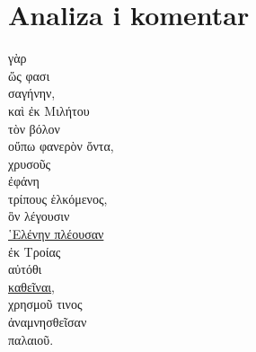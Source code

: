 \section*{Analiza i komentar}



{\large
\noindent {} γὰρ \\
\tabto{2em} ὥς φασι \\
 σαγήνην, \\
καὶ  ἐκ Μιλήτου \\
\tabto{4em} τὸν βόλον \\
\tabto{6em} οὔπω φανερὸν ὄντα, \\
χρυσοῦς \\
ἐφάνη \\
τρίπους ἑλκόμενος, \\
\tabto{2em} ὃν λέγουσιν \\
\tabto{4em} \underline{῾Ελένην πλέουσαν} \\
\tabto{6em} ἐκ Τροίας \\
\tabto{6em} αὐτόθι\\
\tabto{4em} \underline{καθεῖναι}, \\
\tabto{6em} χρησμοῦ τινος\\
\tabto{4em} ἀναμνησθεῖσαν \\
\tabto{6em} παλαιοῦ.\\

}

